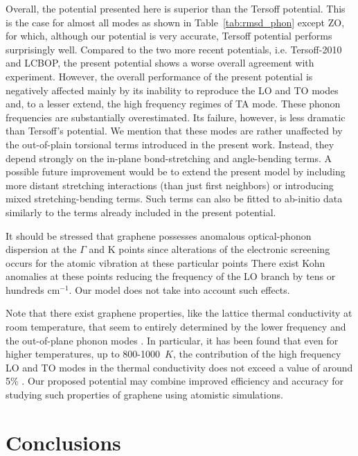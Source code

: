 \documentclass[aps,prb,floatfix,twocolumn,showpacs]{revtex4}
\begin{document}
Overall, the potential presented here is superior than the
Tersoff potential. This is the case for almost all modes as shown in Table~\ref{tab:rmsd_phon}
except ZO, for which, although our potential is very accurate, Tersoff potential performs
surprisingly well. Compared to the two more recent potentials, i.e. Tersoff-2010 and LCBOP,
the present potential shows a worse overall agreement with experiment. 
However, the overall performance of the present potential is negatively affected mainly by its 
inability to reproduce the LO and TO modes and, to a lesser extend, the high frequency regimes of TA mode.
These phonon frequencies are substantially overestimated. Its failure,
however, is less dramatic than Tersoff's potential. 
We mention that these modes are rather unaffected by
the out-of-plain torsional terms introduced in the present work. Instead, they depend strongly
on the in-plane bond-stretching and angle-bending terms. A possible future improvement would be
to extend the present model by including more distant stretching interactions (than just first neighbors)
or introducing mixed  stretching-bending terms. Such terms can also be fitted to ab-initio data 
similarly to the terms already included in the present potential. 

It should be stressed that graphene possesses anomalous optical-phonon dispersion at the 
$\Gamma$ and K points since alterations of the electronic screening occurs  for the 
atomic vibration at these particular points\cite{PhysRevLett.93.185503,FerrariSSC}
There exist Kohn anomalies at these points
reducing the frequency of the LO branch by tens or hundreds cm$^{-1}$. Our model does not
take into account such effects.

Note that there exist graphene properties, like the lattice thermal conductivity at room temperature,
that seem to entirely determined by the lower frequency and the out-of-plane phonon modes \cite{tcJAP14,tcJAP15}.
In particular, it has been found that even for higher temperatures, up to 800-1000~$K$,
the contribution of the high frequency LO and TO modes in the thermal conductivity does not exceed
a value of around 5\% \cite{tcJAP14,tcJAP15}. Our proposed potential may combine improved efficiency
and accuracy for studying such properties of graphene using atomistic simulations.



\section{\label{sec:conclusion} Conclusions}
\end{document}
